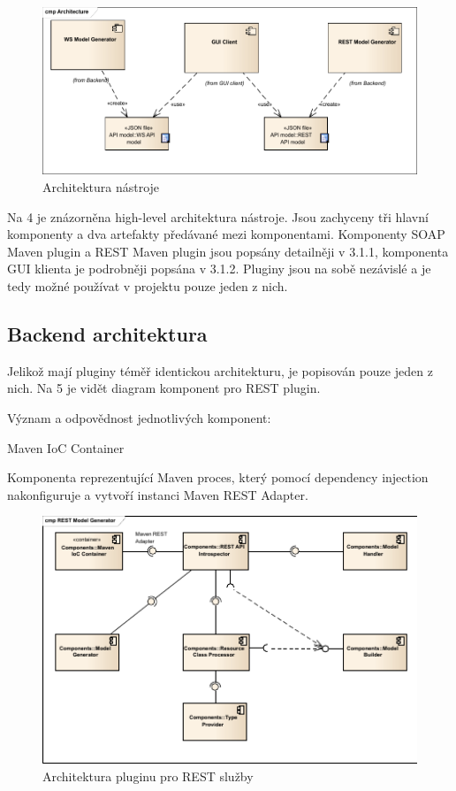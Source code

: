\documentclass[11pt,twoside,a4paper]{book}
\begin{document}
\begin{itemize}
\begin{figure}[h]
\begin{center}
\includegraphics[width=13cm]{images-pdf/Architecture.pdf}
\caption{Architektura nástroje}
\label{fig:logo}
\end{center}
\end{figure}

Na 4 je znázorněna high-level architektura nástroje. Jsou zachyceny tři hlavní komponenty a
dva artefakty předávané mezi komponentami. Komponenty SOAP Maven plugin a REST
Maven plugin jsou popsány detailněji v 3.1.1, komponenta GUI klienta je podrobněji popsána
v 3.1.2. Pluginy jsou na sobě nezávislé a je tedy možné používat v projektu pouze jeden z
nich.

\subsection{Backend architektura}

Jelikož mají pluginy téměř identickou architekturu, je popisován pouze jeden z nich. Na 5 je
vidět diagram komponent pro REST plugin.

Význam a odpovědnost jednotlivých komponent:

Maven IoC Container

Komponenta reprezentující Maven proces, který pomocí dependency injection nakonfiguruje
a vytvoří instanci Maven REST Adapter.

\begin{figure}[h]
\begin{center}
\includegraphics[width=13cm]{images-pdf/REST Model Generator.pdf}
\caption{Architektura pluginu pro REST služby}
\label{fig:logo}
\end{center}
\end{figure}


\end{itemize}
\end{document}
